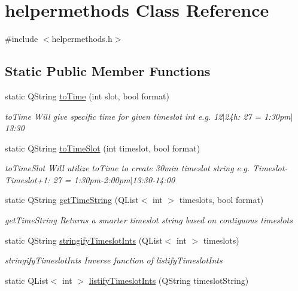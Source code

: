 \hypertarget{classhelpermethods}{}\section{helpermethods Class Reference}
\label{classhelpermethods}


{\ttfamily \#include $<$helpermethods.\+h$>$}

\subsection*{Static Public Member Functions}
\begin{DoxyCompactItemize}
\item 
static Q\+String \hyperlink{classhelpermethods_a5357a7fde87ac02fce1e8ed64aa53648}{to\+Time} (int slot, bool format)
\begin{DoxyCompactList}\small\item\em to\+Time Will give specific time for given timeslot int e.\+g. 12$\vert$24h\+: 27 = 1\+:30pm$\vert$13\+:30 \end{DoxyCompactList}\item 
static Q\+String \hyperlink{classhelpermethods_a3ab55da6e3e7558936e9881f30465e75}{to\+Time\+Slot} (int timeslot, bool format)
\begin{DoxyCompactList}\small\item\em to\+Time\+Slot Will utilize to\+Time to create 30min timeslot string e.\+g. Timeslot-\/\+Timeslot+1\+: 27 = 1\+:30pm-\/2\+:00pm$\vert$13\+:30-\/14\+:00 \end{DoxyCompactList}\item 
static Q\+String \hyperlink{classhelpermethods_a8eb0fa4dbe1ac5465ba69976ed93b7e9}{get\+Time\+String} (Q\+List$<$ int $>$ timeslots, bool format)
\begin{DoxyCompactList}\small\item\em get\+Time\+String Returns a smarter timeslot string based on contiguous timeslots \end{DoxyCompactList}\item 
static Q\+String \hyperlink{classhelpermethods_aa6324bf2fa835db5e8baacc6500e0447}{stringify\+Timeslot\+Ints} (Q\+List$<$ int $>$ timeslots)
\begin{DoxyCompactList}\small\item\em stringify\+Timeslot\+Ints Inverse function of listify\+Timeslot\+Ints \end{DoxyCompactList}\item 
static Q\+List$<$ int $>$ \hyperlink{classhelpermethods_ab2c39e2fbd1d97104b57f8f5cbf2c3ab}{listify\+Timeslot\+Ints} (Q\+String timeslot\+String)

\end{DoxyCompactItemize}
